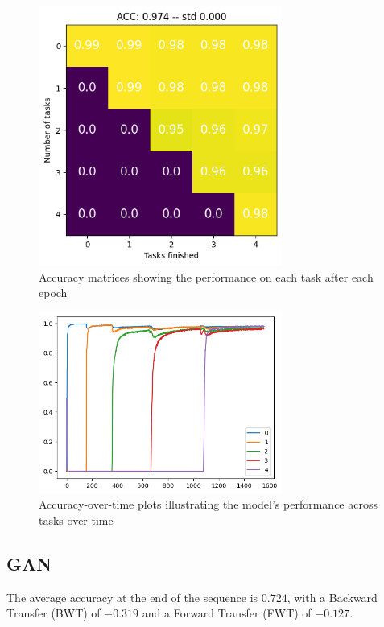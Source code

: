 \documentclass{article}
\begin{document}
\begin{figure}[h!]
\centering
\includegraphics[width=8cm]{imgs/vanilla1.png}
\caption{Accuracy matrices showing the performance on each task after each epoch}
\label{fig:1}
\end{figure}
\begin{figure}[h!]
\centering
\includegraphics[width=8cm]{imgs/vanilla2.png}
\caption{Accuracy-over-time plots illustrating the model's performance across tasks over time}
\label{fig:2}
\end{figure}

\subsection{GAN}
The average accuracy at the end of the sequence is $0.724$, with a Backward Transfer (BWT) of $-0.319$ and a Forward Transfer (FWT) of $-0.127$.
\end{document}
